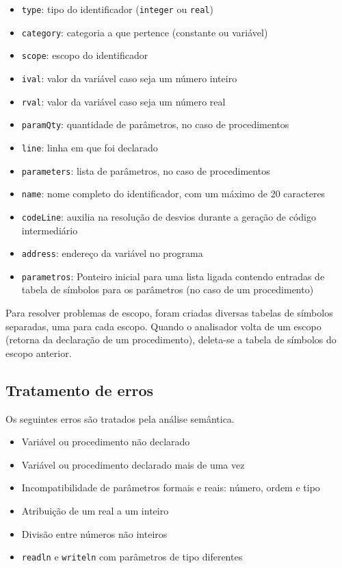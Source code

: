 \documentclass{article}
\begin{document}
		\begin{itemize}
			\item \verb=type=: tipo do identificador (\verb=integer= ou \verb=real=)
			\item \verb=category=: categoria a que pertence (constante ou variável)
			\item \verb=scope=: escopo do identificador
			\item \verb=ival=: valor da variável caso seja um número inteiro
			\item \verb=rval=: valor da variável caso seja um número real
			\item \verb=paramQty=: quantidade de parâmetros, no caso de procedimentos
			\item \verb=line=: linha em que foi declarado
			\item \verb=parameters=: lista de parâmetros, no caso de procedimentos
			\item \verb=name=: nome completo do identificador, com um máximo de 20 caracteres
			\item \verb=codeLine=: auxilia na resolução de desvios durante a geração de código intermediário
			\item \verb=address=: endereço da variável no programa
			\item \verb=parametros=: Ponteiro inicial para uma lista ligada contendo entradas de tabela de símbolos para os parâmetros (no caso de um procedimento)
		\end{itemize}

	Para resolver problemas de escopo, foram criadas diversas tabelas de símbolos separadas, uma para cada escopo. Quando o analisador volta de um escopo (retorna da declaração de um procedimento), deleta-se a tabela de símbolos do escopo anterior. 

	\subsection{Tratamento de erros} %
	\label{ssub:tratamento_de_erros}
		Os seguintes erros são tratados pela análise semântica.

		\begin{itemize}
			\item Variável ou procedimento não declarado
			\item Variável ou procedimento declarado mais de uma vez
			\item Incompatibilidade de parâmetros formais e reais: número, ordem e tipo
			\item Atribuição de um real a um inteiro
			\item Divisão entre números não inteiros
			\item \verb=readln= e \verb=writeln= com parâmetros de tipo diferentes
		\end{itemize}
	
\end{document}
